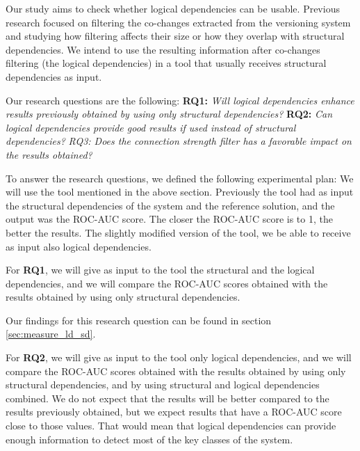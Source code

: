 \documentclass[runningheads]{comsis2}
\begin{document}
Our study aims to check whether logical dependencies can be usable. Previous research focused on filtering the co-changes extracted from the versioning system and studying how filtering affects their size or how they overlap with structural dependencies. We intend to use the resulting information after co-changes filtering (the logical dependencies) in a tool that usually receives structural dependencies as input.

Our research questions are the following: \textbf{RQ1:} \textit{Will logical dependencies enhance results previously obtained by using only structural dependencies?} \textbf{RQ2:} \textit{Can logical dependencies provide good results if used instead of structural dependencies?} \textit{RQ3: Does the connection strength filter has a favorable impact on the results obtained?}

To answer the research questions, we defined the following experimental plan: 
We will use the tool mentioned in the above section. Previously the tool had as input the structural dependencies of the system and the reference solution, and the output was the ROC-AUC score. The closer the ROC-AUC score is to 1, the better the results.  
The slightly modified version of the tool, we be able to receive as input also logical dependencies.


For \textbf {RQ1}, we will give as input to the tool the structural and the logical dependencies, and we will compare the ROC-AUC scores obtained with the results obtained by using only structural dependencies.


\noindent{}
\medskip

Our findings for this research question can be found in section \ref{sec:measure_ld_sd}.


For \textbf {RQ2}, we will give as input to the tool only logical dependencies, and we will compare the ROC-AUC scores obtained with the results obtained by using only structural dependencies, and by using structural and logical dependencies combined.
We do not expect that the results will be better compared to the results previously obtained, but we expect results that have a ROC-AUC score close to those values. That would mean that logical dependencies can provide enough information to detect most of the key classes of the system.
\end{document}
